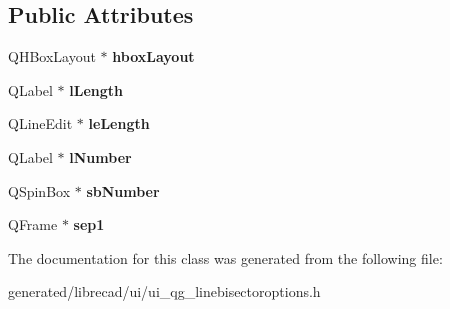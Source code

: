 \subsection*{Public Attributes}
\begin{DoxyCompactItemize}
\item 
\hypertarget{classUi__QG__LineBisectorOptions_aa89bf740d2f1c594d6a3495781091d77}{Q\-H\-Box\-Layout $\ast$ {\bfseries hbox\-Layout}}\label{classUi__QG__LineBisectorOptions_aa89bf740d2f1c594d6a3495781091d77}

\item 
\hypertarget{classUi__QG__LineBisectorOptions_ac71fa1813dfd42428b39a6b57906e302}{Q\-Label $\ast$ {\bfseries l\-Length}}\label{classUi__QG__LineBisectorOptions_ac71fa1813dfd42428b39a6b57906e302}

\item 
\hypertarget{classUi__QG__LineBisectorOptions_a911c47109c2a6426825d662b34b49cec}{Q\-Line\-Edit $\ast$ {\bfseries le\-Length}}\label{classUi__QG__LineBisectorOptions_a911c47109c2a6426825d662b34b49cec}

\item 
\hypertarget{classUi__QG__LineBisectorOptions_a26f7d85aa55738c2a35cc23c4222f59a}{Q\-Label $\ast$ {\bfseries l\-Number}}\label{classUi__QG__LineBisectorOptions_a26f7d85aa55738c2a35cc23c4222f59a}

\item 
\hypertarget{classUi__QG__LineBisectorOptions_ab7fd21f6b9a126f796f3bbd1e63d952e}{Q\-Spin\-Box $\ast$ {\bfseries sb\-Number}}\label{classUi__QG__LineBisectorOptions_ab7fd21f6b9a126f796f3bbd1e63d952e}

\item 
\hypertarget{classUi__QG__LineBisectorOptions_a4c381c07665b11608e1a34fa89c59dd6}{Q\-Frame $\ast$ {\bfseries sep1}}\label{classUi__QG__LineBisectorOptions_a4c381c07665b11608e1a34fa89c59dd6}

\end{DoxyCompactItemize}


The documentation for this class was generated from the following file\-:\begin{DoxyCompactItemize}
\item 
generated/librecad/ui/ui\-\_\-qg\-\_\-linebisectoroptions.\-h\end{DoxyCompactItemize}
